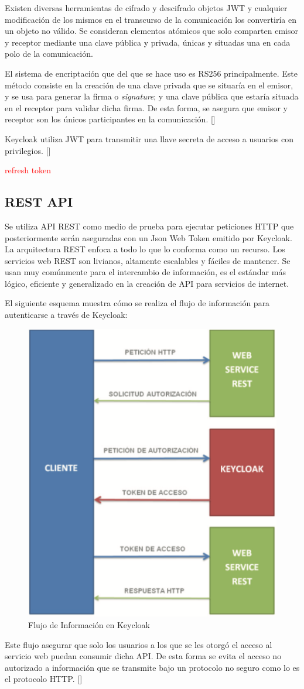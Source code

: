 Existen diversas herramientas de cifrado y descifrado objetos JWT y cualquier modificación de los mismos en el transcurso de la comunicación los convertiría en un objeto no válido. Se consideran elementos atómicos que solo comparten emisor y receptor mediante una clave pública y privada, únicas y situadas una en cada polo de la comunicación. 

El sistema de encriptación que del que se hace uso es RS256 principalmente. Este método consiste en la creación de una clave privada que se situaría en el emisor, y se usa para generar la firma o \textit{signature}; y una clave pública que estaría situada en el receptor para validar dicha firma. De esta forma, se asegura que emisor y receptor son los únicos participantes en la comunicación. [\cite{lobato2022regulacion}]

 Keycloak utiliza JWT para transmitir una llave secreta de acceso a usuarios con privilegios. [\cite{muyon2020metodos}]

\textcolor{red}{refresh token}

\subsection{REST API}
Se utiliza API REST como medio de prueba para ejecutar peticiones HTTP que posteriormente serán aseguradas con un Json Web Token emitido por Keycloak. La arquitectura REST enfoca a todo lo que lo conforma como un recurso. Los servicios web REST son livianos, altamente escalables y fáciles de mantener. Se usan muy comúnmente para el intercambio de información, es el estándar más lógico, eficiente y generalizado en la creación de API para servicios de internet.

El siguiente esquema muestra cómo se realiza el flujo de información para autenticarse a través de Keycloak:

\begin{figure}[H]
	\centering
	\includegraphics[width=0.7\linewidth]{Graphics/keycloak_info_flux}
	\caption{Flujo de Información en Keycloak}
	\label{fig:Flujo de Información en Keycloak}
\end{figure}

Este flujo asegurar que solo los usuarios a los que se les otorgó el acceso al servicio web puedan consumir dicha API. De esta forma se evita el acceso no autorizado a información que se transmite bajo un protocolo no seguro como lo es el protocolo HTTP. [\cite{muyon2020metodos}]
